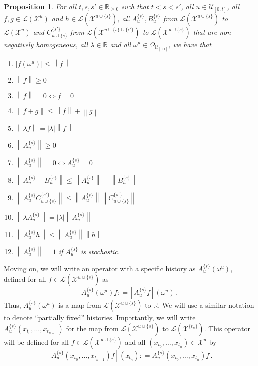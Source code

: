 \documentclass[10pt]{paper}
\newtheorem{proposition}[theorem]{Proposition}
\newcommand{\reals}{\mathbb{R}}
\newcommand{\realsnonneg}{\reals_{\geq 0}}
\newcommand{\states}{\mathcal{X}}
\newcommand{\gambles}{\mathcal{L}}
\newcommand{\asa}{\Leftrightarrow}
\newcommand{\norm}[1]{\left\lVert #1 \right\rVert}
\newcommand{\abs}[1]{\left\vert #1 \right\vert}
\newcommand{\coloneqq}{:\!=}
\begin{document}
\begin{proposition}For all $t,s,s'\in\realsnonneg$ such that $t<s<s'$, all $u\in\mathcal{U}_{[0,t]}$, all $f,g\in\gambles(\states^u)$ and $h\in\gambles(\states^{u\cup\{s\}})$, all $A_u^{\{s\}},B_u^{\{s\}}$ from $\gambles(\states^{u\cup \{s\}})$ to $\gambles(\states^u)$ and $C_{u\cup \{s\}}^{\{s'\}}$ from $\gambles(\states^{u\cup \{s\}\cup \{s'\}})$ to $\gambles(\states^{u\cup \{s\}})$ that are non-negatively homogeneous, all $\lambda\in\mathbb{R}$ and all $\omega^u\in\Omega_{\mathcal{U}_{[0,t]}}$, we have that
\vspace{5pt}

\begin{enumerate}[label=N\arabic*:]
\item
$\abs{f(\omega^u)}\leq\norm{f}$
\item
$\norm{f}\geq0$
\item
$\norm{f}=0\asa f=0$
\item
$\norm{f+g}\leq\norm{f}+\norm{g}$
\item
$\norm{\lambda f}=\abs{\lambda}\norm{f}$
\item
$\norm{A_u^{\{s\}}}\geq0$
\item
$\norm{A_u^{\{s\}}}=0\asa A_u^{\{s\}}=0$
\item
$\norm{A_u^{\{s\}}+B_u^{\{s\}}}\leq\norm{A_u^{\{s\}}}+\norm{B_u^{\{s\}}}$
\item
$\norm{A_u^{\{s\}}C_{u\cup \{s\}}^{\{s'\}}}\leq\norm{A_u^{\{s\}}}\norm{C_{u\cup \{s\}}^{\{s'\}}}$
\item
$\norm{\lambda A_u^{\{s\}}}=\abs{\lambda}\norm{A_u^{\{s\}}}$
\item
$\norm{A_u^{\{s\}}h}\leq\norm{A_u^{\{s\}}}\norm{h}$
\item
$\norm{A_u^{\{s\}}}=1$ if $A_u^{\{s\}}$ is stochastic.
\end{enumerate}
\vspace{5pt}
\end{proposition}

Moving on, we will write an operator with a specific history as $A_u^{\{s\}}(\omega^u)$, defined for all $f\in\gambles(\states^{u\cup\{s\}})$ as
\begin{equation*}
A_u^{\{s\}}(\omega^u)f \coloneqq \left[A_u^{\{s\}}f\right](\omega^u)\,.
\end{equation*}
Thus, $A_u^{\{s\}}(\omega^u)$ is a map from $\gambles(\states^{u\cup\{s\}})$ to $\mathbb{R}$. %
We will use a similar notation to denote ``partially fixed'' histories. Importantly, we will write $A_u^{\{s\}}(x_{t_0},\ldots,x_{t_{n-1}})$ for the map from $\gambles(\states^{u\cup\{s\}})$ to $\gambles(\states^{\{t_n\}})$. This operator will be defined for all $f\in\gambles(\states^{u\cup\{s\}})$ and all $(x_{t_0},\ldots,x_{t_n})\in\states^u$ by
\begin{equation*}
\left[A_u^{\{s\}}(x_{t_0},\ldots,x_{t_{n-1}})f\right](x_{t_n}) \coloneqq A_u^{\{s\}}(x_{t_0},\ldots,x_{t_n})f\,.
\end{equation*}
\end{document}
